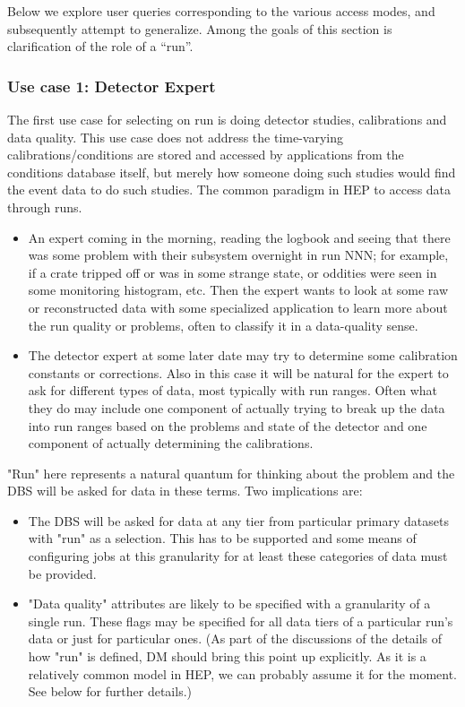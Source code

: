 \documentclass{cmspaper}
\begin{document}
Below we explore user queries corresponding to the various access modes,
and subsequently attempt to generalize. Among the goals of this section
is clarification of the role of a ``run''.

\subsubsection{Use case 1: Detector Expert}

  The first use case for selecting on run is doing detector studies, calibrations
and data quality. This use case does not address the time-varying 
calibrations/conditions are stored and accessed by applications from the 
conditions database itself, but merely how someone doing such studies would 
find the event data to do such studies. The common paradigm in HEP to access 
data through runs.
\begin{itemize}
\item An expert coming in the morning, reading the logbook and seeing that there was
     some problem with their subsystem overnight in run NNN; for example, if a crate 
     tripped off or was in some strange state, or oddities were seen in some 
     monitoring histogram, etc. Then the expert wants to look at some raw or 
     reconstructed data with some specialized application to learn more about the
     run quality or problems, often to classify it in a data-quality sense.
\item The detector expert at some later date may try to determine
     some calibration constants or corrections. Also in this case it will be natural
     for the expert to ask for different types of data, most typically with
     run ranges. Often what they do may include one component of actually 
     trying to break up the data into run ranges based on the problems and
     state of the detector and one component of actually determining the
     calibrations. 
\end{itemize}

"Run" here represents a natural quantum for thinking about the problem and
the DBS will be asked for data in these terms. Two implications are:
\begin{itemize}
\item The DBS will be asked for data at any tier from particular
    primary datasets with "run" as a selection. This has to be supported and
    some means of configuring jobs at this granularity for at least these
    categories of data must be provided.
\item "Data quality" attributes are likely 
    to be specified with a granularity of a single run. These flags may be
    specified for all data tiers of a particular run's data or just
    for particular ones. (As part of the discussions of the details of how
    "run" is defined, DM should bring this point up explicitly. As it is a 
    relatively common model in HEP, we can probably assume it for the moment.
    See below for further details.)
\end{itemize}
\end{document}
